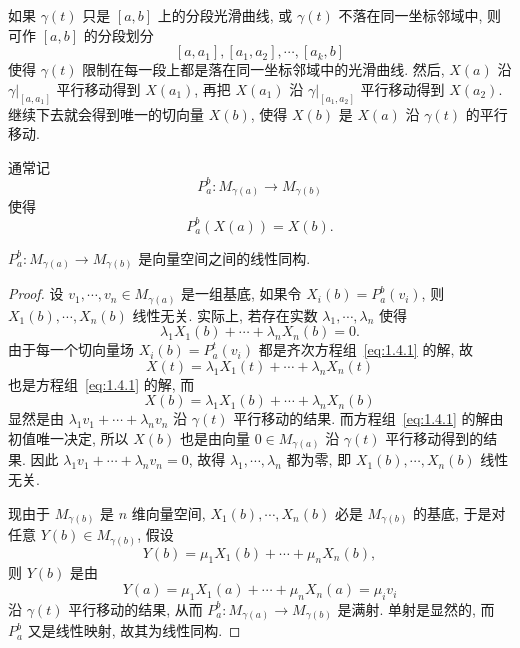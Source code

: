 如果 $\gamma(t)$ 只是 $[a,b]$ 上的分段光滑曲线, 或 $\gamma(t)$
不落在同一坐标邻域中, 则可作 $[a,b]$ 的分段划分
\[[a,a_1], [a_1,a_2], \cdots, [a_k,b]\]
使得 $\gamma(t)$ 限制在每一段上都是落在同一坐标邻域中的光滑曲线.
然后, $X(a)$ 沿 $\gamma|_{[a,a_1]}$ 平行移动得到 $X(a_1)$,
再把 $X(a_1)$ 沿 $\gamma|_{[a_1,a_2]}$ 平行移动得到 $X(a_2)$.
继续下去就会得到唯一的切向量 $X(b)$, 使得 $X(b)$ 是 $X(a)$ 沿 $\gamma(t)$ 的平行移动.

通常记
\[P_a^b\colon M_{\gamma(a)}\longrightarrow M_{\gamma(b)}\]
使得
\[P_a^b(X(a)) = X(b).\]


\begin{theorem}
  $P_a^b\colon M_{\gamma(a)}\longrightarrow M_{\gamma(b)}$
  是向量空间之间的线性同构.
\end{theorem}

\begin{proof}
  设 $v_1,\cdots,v_n\in M_{\gamma(a)}$ 是一组基底, 如果令 $X_i(b)=P_a^b(v_i)$, 则
  $X_1(b),\cdots, X_n(b)$ 线性无关. 实际上, 若存在实数 $\lambda_1,\cdots,\lambda_n$ 使得
  \[\lambda_1 X_1(b)+\cdots+\lambda_n X_n(b)=0.\]
  由于每一个切向量场 $X_i(b)=P_a^t(v_i)$ 都是齐次方程组~\eqref{eq:1.4.1} 的解, 故
  \[X(t) = \lambda_1 X_1(t)+\cdots+\lambda_n X_n(t)\]
  也是方程组~\eqref{eq:1.4.1} 的解, 而
  \[X(b) = \lambda_1 X_1(b)+\cdots+\lambda_n X_n(b)\]
  显然是由 $\lambda_1 v_1+\cdots+\lambda_n v_n$ 沿 $\gamma(t)$ 平行移动的结果.
  而方程组~\eqref{eq:1.4.1} 的解由初值唯一决定, 所以 $X(b)$
  也是由向量 $0\in M_{\gamma(a)}$ 沿 $\gamma(t)$ 平行移动得到的结果.
  因此 $\lambda_1 v_1+\cdots+\lambda_n v_n=0$,
  故得 $\lambda_1,\cdots,\lambda_n$ 都为零, 即
  $X_1(b),\cdots,X_n(b)$ 线性无关.

  现由于 $M_{\gamma(b)}$ 是 $n$ 维向量空间, $X_1(b),\cdots,X_n(b)$
  必是 $M_{\gamma(b)}$ 的基底, 于是对任意 $Y(b)\in M_{\gamma(b)}$, 假设
  \[Y(b) = \mu_1 X_1(b)+\cdots+\mu_n X_n(b),\]
  则 $Y(b)$ 是由
  \[Y(a) = \mu_1 X_1(a)+\cdots+\mu_n X_n(a) = \mu_i v_i\]
  沿 $\gamma(t)$ 平行移动的结果, 从而 $P_a^b\colon M_{\gamma(a)}\to M_{\gamma(b)}$
  是满射. 单射是显然的, 而 $P_a^b$ 又是线性映射, 故其为线性同构.
\end{proof}


